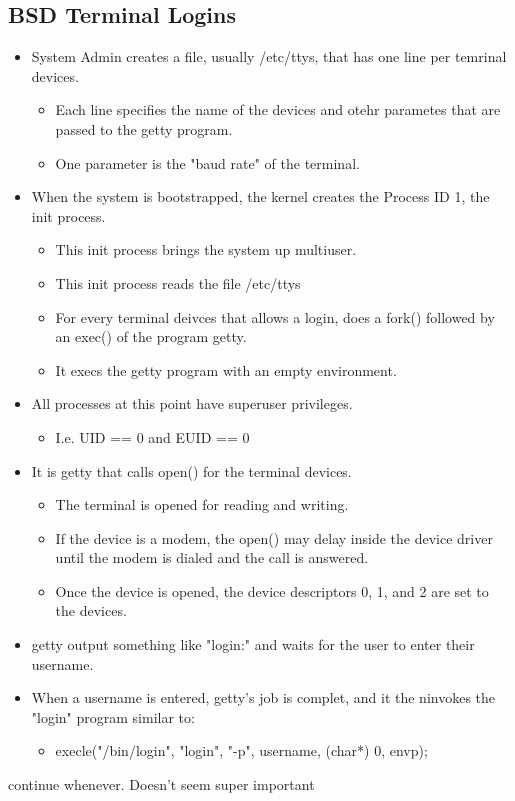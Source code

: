 \documentclass{article}
\begin{document}
\subsection{BSD Terminal Logins}
\begin{itemize}
    \item System Admin creates a file, usually /etc/ttys, that has one line per temrinal devices.
        \begin{itemize}
            \item Each line specifies the name of the devices and otehr parametes that are passed to the getty program.
            \item One parameter is the "baud rate" of the terminal.
        \end{itemize}

    \item When the system is bootstrapped, the kernel creates the Process ID 1, the init 
        process.
        \begin{itemize}
            \item This init process brings the system up multiuser.
            \item This init process reads the file /etc/ttys
            \item For every terminal deivces that allows a login, does a fork() 
                followed by an exec() of the program getty.
            \item It execs the getty program with an empty environment.
        \end{itemize}
    \item All processes at this point have superuser privileges.
        \begin{itemize}
            \item I.e. UID == 0 and EUID == 0
        \end{itemize}
    \item It is getty that calls open() for the terminal devices.
        \begin{itemize}
            \item The terminal is opened for reading and writing.
            \item If the device is a modem, the open() may delay inside the device driver until the modem is dialed and the call is answered.
            \item Once the device is opened, the device descriptors 0, 1, and 2 are set to the devices.
        \end{itemize}

    \item getty output something like "login:" and waits for the user to enter their username.
    \item When a username is entered, getty's job is complet, and it the ninvokes the "login" program similar to:
        \begin{itemize}
            \item execle("/bin/login", "login", "-p", username, (char*) 0, envp); \newline
        \end{itemize}
\end{itemize}
continue whenever. Doesn't seem super important
\end{document}
